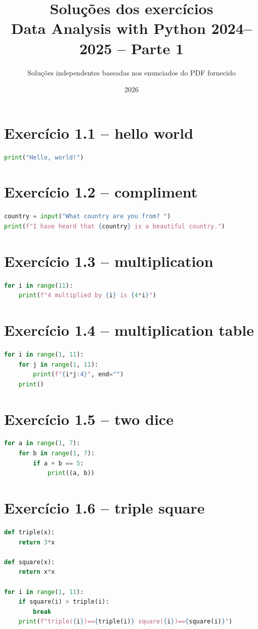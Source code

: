 \documentclass[11pt,a4paper]{article}
\title{Soluções dos exercícios\\Data Analysis with Python 2024--2025 -- Parte 1}
\author{Soluções independentes baseadas nos enunciados do PDF fornecido}
\date{2026}
\begin{document}
\maketitle
\tableofcontents
\section{Exercício 1.1 -- hello world}
\begin{lstlisting}[language=Python]
print("Hello, world!")
\end{lstlisting}

\section{Exercício 1.2 -- compliment}
\begin{lstlisting}[language=Python]
country = input("What country are you from? ")
print(f"I have heard that {country} is a beautiful country.")
\end{lstlisting}

\section{Exercício 1.3 -- multiplication}
\begin{lstlisting}[language=Python]
for i in range(11):
    print(f"4 multiplied by {i} is {4*i}")
\end{lstlisting}

\section{Exercício 1.4 -- multiplication table}
\begin{lstlisting}[language=Python]
for i in range(1, 11):
    for j in range(1, 11):
        print(f"{i*j:4}", end="")
    print()
\end{lstlisting}

\section{Exercício 1.5 -- two dice}
\begin{lstlisting}[language=Python]
for a in range(1, 7):
    for b in range(1, 7):
        if a + b == 5:
            print((a, b))
\end{lstlisting}

\section{Exercício 1.6 -- triple square}
\begin{lstlisting}[language=Python]
def triple(x):
    return 3*x

def square(x):
    return x*x

for i in range(1, 11):
    if square(i) > triple(i):
        break
    print(f"triple({i})=={triple(i)} square({i})=={square(i)}")
\end{lstlisting}
\end{document}
